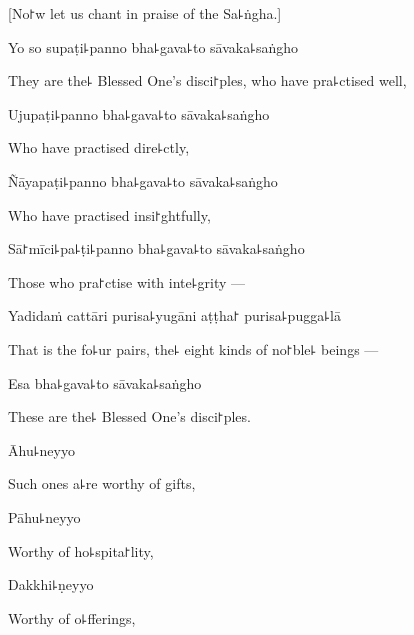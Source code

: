 \begin{english}
  [No꜓w let us chant in praise of the Sa꜕ṅgha.]
\end{english}

Yo so supaṭi꜕panno bha꜕gava꜕to sāvaka꜕saṅgho

\begin{english}
  They are the꜕ Blessed One's disci꜓ples, who have pra꜕ctised well,
\end{english}

Ujupaṭi꜕panno bha꜕gava꜕to sāvaka꜕saṅgho

\begin{english}
  Who have practised dire꜕ctly,
\end{english}

Ñāyapaṭi꜕panno bha꜕gava꜕to sāvaka꜕saṅgho

\begin{english}
  Who have practised insi꜓ghtfully,
\end{english}

Sā꜓mīci꜕pa꜕ṭi꜕panno bha꜕gava꜕to sāvaka꜕saṅgho

\begin{english}
  Those who pra꜓ctise with inte꜕grity ---
\end{english}

Yadidaṁ cattāri purisa꜕yugāni aṭṭha꜓ purisa꜕pugga꜕lā

\begin{english}
  That is the fo꜕ur pairs, the꜕ eight kinds of no꜓ble꜕ beings ---
\end{english}

Esa bha꜕gava꜕to sāvaka꜕saṅgho

\begin{english}
  These are the꜕ Blessed One's disci꜓ples.
\end{english}

Āhu꜕neyyo

\begin{english}
  Such ones a꜕re worthy of gifts,
\end{english}

Pāhu꜕neyyo

\begin{english}
  Worthy of ho꜕spita꜓lity,
\end{english}

\clearpage

Dakkhi꜕ṇeyyo

\begin{english}
  Worthy of o꜕fferings,
\end{english}

